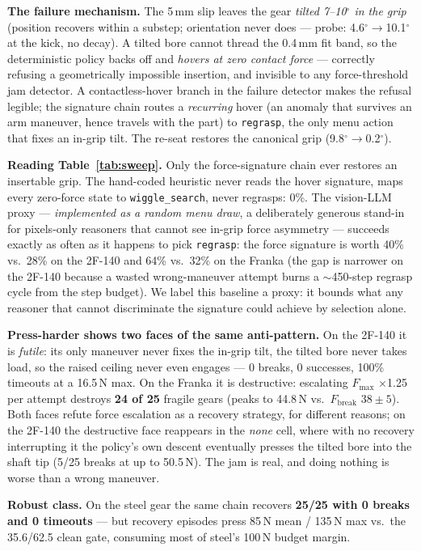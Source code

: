 \documentclass[11pt]{article}
\newcommand{\Fmax}{\ensuremath{F_{\max}}}
\newcommand{\Fbreak}{\ensuremath{F_{\mathrm{break}}}}
\newcommand{\code}[1]{\texttt{\small #1}}
\begin{document}
\textbf{The failure mechanism.} The 5\,mm slip leaves the gear \emph{tilted 7--10$^\circ$ in the grip} (position recovers within a substep; orientation never does --- probe: 4.6$^\circ\to$10.1$^\circ$ at the kick, no decay). A tilted bore cannot thread the 0.4\,mm fit band, so the deterministic policy backs off and \emph{hovers at zero contact force} --- correctly refusing a geometrically impossible insertion, and invisible to any force-threshold jam detector. A contactless-hover branch in the failure detector makes the refusal legible; the signature chain routes a \emph{recurring} hover (an anomaly that survives an arm maneuver, hence travels with the part) to \code{regrasp}, the only menu action that fixes an in-grip tilt. The re-seat restores the canonical grip (9.8$^\circ\to$0.2$^\circ$).

\textbf{Reading Table~\ref{tab:sweep}.} Only the force-signature chain ever restores an insertable grip. The hand-coded heuristic never reads the hover signature, maps every zero-force state to \code{wiggle\_search}, never regrasps: 0\%. The vision-LLM proxy --- \emph{implemented as a random menu draw}, a deliberately generous stand-in for pixels-only reasoners that cannot see in-grip force asymmetry --- succeeds exactly as often as it happens to pick \code{regrasp}: the force signature is worth 40\% vs.\ 28\% on the 2F-140 and 64\% vs.\ 32\% on the Franka (the gap is narrower on the 2F-140 because a wasted wrong-maneuver attempt burns a $\sim$450-step regrasp cycle from the step budget). We label this baseline a proxy: it bounds what any reasoner that cannot discriminate the signature could achieve by selection alone.

\textbf{Press-harder shows two faces of the same anti-pattern.} On the 2F-140 it is \emph{futile}: its only maneuver never fixes the in-grip tilt, the tilted bore never takes load, so the raised ceiling never even engages --- 0 breaks, 0 successes, 100\% timeouts at a 16.5\,N max. On the Franka it is destructive: escalating \Fmax{} $\times$1.25 per attempt destroys \textbf{24 of 25} fragile gears (peaks to 44.8\,N vs.\ \Fbreak{} $38\pm5$). Both faces refute force escalation as a recovery strategy, for different reasons; on the 2F-140 the destructive face reappears in the \emph{none} cell, where with no recovery interrupting it the policy's own descent eventually presses the tilted bore into the shaft tip (5/25 breaks at up to 50.5\,N). The jam is real, and doing nothing is worse than a wrong maneuver.

\textbf{Robust class.} On the steel gear the same chain recovers \textbf{25/25 with 0 breaks and 0 timeouts} --- but recovery episodes press 85\,N mean / 135\,N max vs.\ the 35.6/62.5 clean gate, consuming most of steel's 100\,N budget margin.
\end{document}
